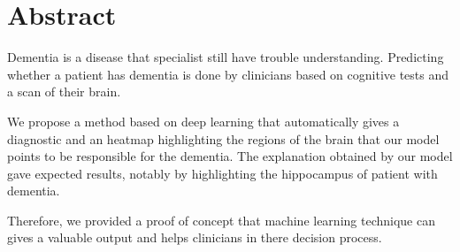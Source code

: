 \chapter{Abstract}
Dementia is a disease that specialist still have trouble understanding. Predicting whether a patient has dementia is done by clinicians based on cognitive tests and a scan of their brain. 

We propose a method based on deep learning that automatically gives a diagnostic and an heatmap highlighting the regions of the brain that our model points to be responsible for the dementia. The explanation obtained by our model gave expected results, notably by highlighting the hippocampus of patient with dementia.  

Therefore, we provided a proof of concept that machine learning technique can gives a valuable output and helps clinicians in there decision process.